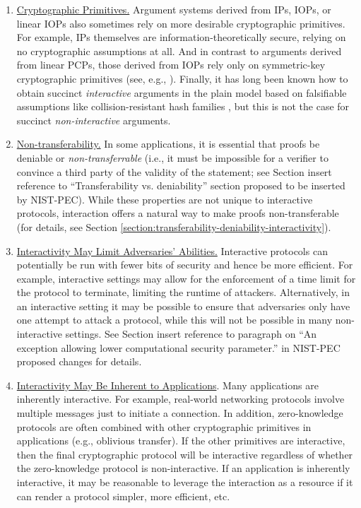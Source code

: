 \begin{enumerate}[label=\alph*.]
\item \underline{Cryptographic Primitives.} Argument systems derived from IPs, IOPs, or linear IOPs also sometimes rely on more desirable cryptographic primitives. For example, IPs themselves are information-theoretically secure, relying on no cryptographic assumptions at all. And
in contrast to arguments derived from linear PCPs, those derived from IOPs rely only on symmetric-key cryptographic primitives (see, e.g., \cite{2016:tcc:IOPs}).
Finally, it has long been known how to obtain succinct \emph{interactive} arguments in the plain model based on falsifiable assumptions like collision-resistant
hash families \cite{1995:crypto:Improved-Efficient-Arguments}, but this is not the case for succinct \emph{non-interactive} arguments.



\item \underline{Non-transferability.} In some applications, it is essential that proofs be deniable or \emph{non-transferrable} (i.e., it must be impossible for a verifier to convince a third party of the validity of the statement; see Section {\color{red}  insert reference to ``Transferability vs. deniability'' section proposed to be inserted by NIST-PEC}). While these properties are not unique to interactive protocols, interaction offers a natural way to make proofs non-transferable (for details, see  Section \ref{section:transferability-deniability-interactivity}). 


\item  \underline{Interactivity May Limit Adversaries' Abilities.}  Interactive protocols can potentially be run with fewer bits of security and hence be more efficient. For example, interactive settings may allow
for the enforcement of a time limit for the protocol to terminate, limiting the runtime of attackers. Alternatively, 
in an interactive setting
it may be possible to ensure that adversaries only have one attempt to attack a protocol, 
while this will not be possible in many non-interactive settings. See Section {\color{red} insert reference to paragraph on ``An exception allowing lower computational security parameter.'' in NIST-PEC proposed changes} for details.

\item \underline{Interactivity May Be Inherent to Applications}. Many applications are inherently interactive. For example, real-world networking protocols involve multiple messages just to initiate a connection. In addition,
zero-knowledge protocols are often combined with other cryptographic primitives in applications (e.g., oblivious transfer). If the other primitives are interactive, then the final cryptographic protocol will be interactive regardless of whether the zero-knowledge protocol is non-interactive.
If an application is inherently interactive, it may be reasonable to leverage the interaction as a resource if it can render a protocol simpler, more efficient, etc. 


\end{enumerate}
